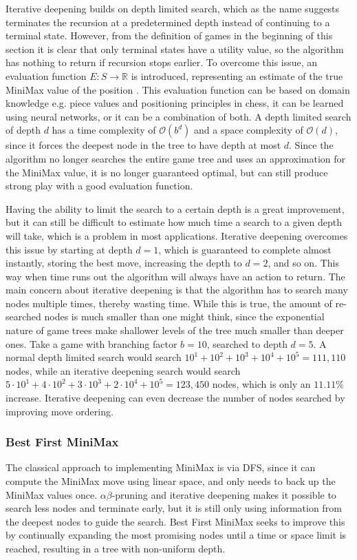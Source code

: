 Iterative deepening builds on depth limited search, which
as the name suggests terminates the recursion at a predetermined
depth instead of continuing to a terminal state. However, from 
the definition of games in the beginning of this section it is
clear that only terminal states have a utility value, so the
algorithm has nothing to return if recursion stops earlier. To
overcome this issue, an evaluation function 
$E: S \rightarrow \mathbb{R}$ is introduced, representing an
estimate of the true MiniMax value of the position \revise. 
This evaluation function can be based on domain knowledge e.g.
piece values and positioning principles in chess, it can be
learned using neural networks, or it can be a combination of both.
A depth limited search of depth $d$ has a time complexity of 
$\mathcal{O}(b^d)$ and a space complexity of $\mathcal{O}(d)$,
since it forces the deepest node in the tree to have depth at most $d$.
Since the algorithm no longer searches the entire game tree and
uses an approximation for the MiniMax value, it is no longer
guaranteed optimal, but can still produce strong play with a good
evaluation function.

Having the ability to limit the search to a certain depth is a
great improvement, but it can still be difficult to estimate
how much time a search to a given depth will take, which is a
problem in most applications. Iterative deepening overcomes this
issue by starting at depth $d=1$, which is guaranteed to complete
almost instantly, storing the best move, increasing the depth to 
$d=2$, and so on. This way when time runs out the algorithm will always
have an action to return. The main concern about iterative deepening
is that the algorithm has to search many nodes multiple times, thereby wasting
time. While this is true, the amount of re-searched nodes is much smaller
than one might think, since the exponential nature of game trees make
shallower levels of the tree much smaller than deeper ones. Take a game
with branching factor $b=10$, searched to depth $d=5$. A normal depth
limited search would search $10^1+10^2+10^3+10^4+10^5=111,110$ nodes, 
while an iterative deepening search would search 
$5 \cdot 10^1+4 \cdot 10^2+3 \cdot 10^3+2 \cdot 10^4+10^5=123,450$ nodes,
which is only an $11.11\%$ increase. \todo Iterative deepening can even
decrease the number of nodes searched by improving move ordering.



\subsubsection{Best First MiniMax}
\needcit
The classical approach to implementing MiniMax is via DFS, since it 
can compute the MiniMax move using linear space, and only needs
to back up the MiniMax values once. $\alpha\beta$-pruning and iterative 
deepening makes it possible to search less nodes and terminate early,
but it is still only using information from the deepest nodes to guide
the search. Best First MiniMax seeks to improve this by continually 
expanding the most promising nodes until a time or space limit is reached,
resulting in a tree with non-uniform depth.

